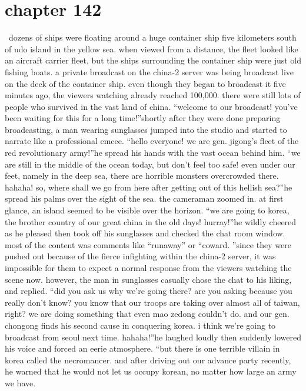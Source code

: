 \section{chapter 142}






 dozens of ships were floating around a huge container ship five kilometers south of udo island in the yellow sea.
when viewed from a distance, the fleet looked like an aircraft carrier fleet, but the ships surrounding the container ship were just old fishing boats.
a private broadcast on the china-2 server was being broadcast live on the deck of the container ship.
 even though they began to broadcast it five minutes ago, the viewers watching already reached 100,000.
 there were still lots of people who survived in the vast land of china.
“welcome to our broadcast! you’ve been waiting for this for a long time!”shortly after they were done preparing broadcasting, a man wearing sunglasses jumped into the studio and started to narrate like a professional emcee.
“hello everyone! we are gen.
 jigong’s fleet of the red revolutionary army!”he spread his hands with the vast ocean behind him.
“we are still in the middle of the ocean today, but don’t feel too safe! even under our feet, namely in the deep sea, there are horrible monsters overcrowded there.
 hahaha! so, where shall we go from here after getting out of this hellish sea?”he spread his palms over the sight of the sea.
 the cameraman zoomed in.
 at first glance, an island seemed to be visible over the horizon.
“we are going to korea, the brother country of our great china in the old days! hurray!”he wildly cheered as he pleased then took off his sunglasses and checked the chat room window.
 most of the content was comments like “runaway” or “coward.
”since they were pushed out because of the fierce infighting within the china-2 server, it was impossible for them to expect a normal response from the viewers watching the scene now.
however, the man in sunglasses casually chose the chat to his liking, and replied.
“did you ask us why we’re going there? are you asking because you really don’t know? you know that our troops are taking over almost all of taiwan, right? we are doing something that even mao zedong couldn’t do.
 and our gen.
 chongong finds his second cause in conquering korea.
 i think we’re going to broadcast from seoul next time.
 hahaha!”he laughed loudly then suddenly lowered his voice and forced an eerie atmosphere.
“but there is one terrible villain in korea called the necromancer.
 and after driving out our advance party recently, he warned that he would not let us occupy korean, no matter how large an army we have.
